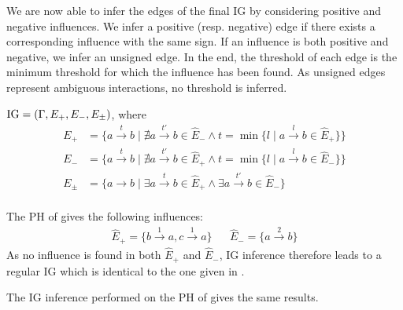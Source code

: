 We are now able to infer the edges of the final IG by considering positive and negative influences. We infer a positive (resp. negative) edge if there exists a corresponding influence with the same sign. If an influence is both positive and negative, we infer an unsigned edge. In the end, the threshold of each edge is the minimum threshold for which the influence has been found. As unsigned edges represent ambiguous interactions, no threshold is inferred.
\begin{definition}\label{def:inference-IG}
$\mathrm{IG} = (\Gamma,E_+,E_-,E_\pm)$, where
\begin{align*}
E_+ &= \{a \xrightarrow{t} b \mid \nexists a \xrightarrow{t'} b \in \hat{E}_-
  \wedge t = \min \{ l \mid a \xrightarrow{l} b \in \hat{E}_+\}\} \\
E_- &= \{a \xrightarrow{t} b \mid \nexists a \xrightarrow{t'} b \in \hat{E}_+
  \wedge t = \min \{l \mid a \xrightarrow{l} b \in \hat{E}_-\}\} \\
E_\pm &= \{a \rightarrow b \mid \exists a \xrightarrow{t} b \in \hat{E}_+ \wedge \exists a \xrightarrow{t'} b \in \hat{E}_-\} \\
\end{align*}
\end{definition}


\begin{example*}
The PH of  gives the following influences:
\begin{align*}
  \hat{E}_+ = \{b \xrightarrow{1} a, c \xrightarrow{1} a\} && \hat{E}_- = \{a \xrightarrow{2} b\}
\end{align*}
As no influence is found in both $\hat{E}_+$ and $\hat{E}_-$, IG inference therefore leads to a regular IG which is identical to the one given in .

The IG inference performed on the PH of  gives the same results.
\end{example*}
